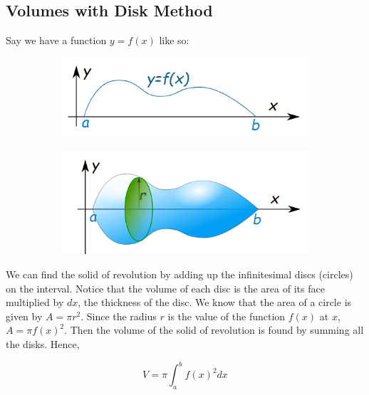     \pagebreak
    \subsection{Volumes with Disk Method}
        Say we have a function $y=f(x)$ like so:

        \begin{figure}[hbt!]
            \centering
            \begin{subfigure}[b]{.45\textwidth}
                \includegraphics[scale=0.8]{Resources/Unit5IntegrationApps/Disc1}
            \end{subfigure}
            \begin{subfigure}[b]{.45\textwidth}
                \includegraphics[scale=0.8]{Resources/Unit5IntegrationApps/Disc2}
            \end{subfigure}
        \end{figure}

        \noindent We can find the solid of revolution by adding up the infinitesimal discs
        (circles) on the interval. Notice that the volume of each disc is the area of its face
        multiplied by $dx$, the thickness of the disc. We know that the area of a circle is
        given by $A=\pi r^2$. Since the radius $r$ is the value of the function $f(x)$ at $x$,
        $A=\pi f(x)^2$. Then the volume of the solid of revolution is found by summing all the
        disks. Hence,

        \begin{equation*}
            V = \pi\int^b_a f(x)^2 dx
        \end{equation*}

